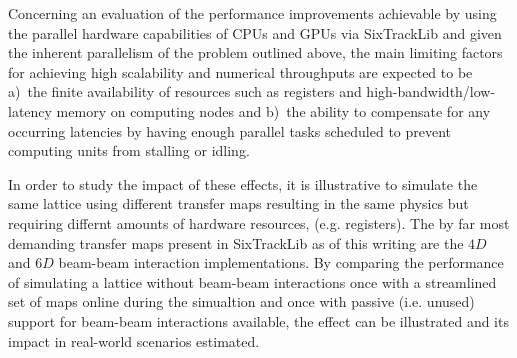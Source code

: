 \documentclass{ws-ijmpa}
\begin{document}
Concerning an evaluation of the performance improvements achievable by using the parallel hardware capabilities of CPUs and GPUs via SixTrackLib and given the inherent parallelism of the problem outlined above, the main limiting factors for achieving high scalability and numerical throughputs are expected to be a)~the finite availability of resources such as registers and high-bandwidth/low-latency memory on computing nodes and 
b)~the ability to compensate for any occurring latencies by having enough parallel tasks scheduled to prevent computing units from stalling or idling. 

In order to study the impact of these effects, it is illustrative to simulate the same lattice using different transfer maps resulting in the same physics but requiring differnt amounts of hardware resources, (e.g. registers). The by far most demanding transfer maps present in SixTrackLib as of this writing are the $4D$ and $6D$ beam-beam interaction implementations. By comparing the performance of simulating a lattice without beam-beam interactions once with a streamlined set of maps online during the simualtion and once with passive (i.e. unused) support for beam-beam interactions available, the effect can be illustrated and its impact in real-world scenarios estimated.
\end{document}
